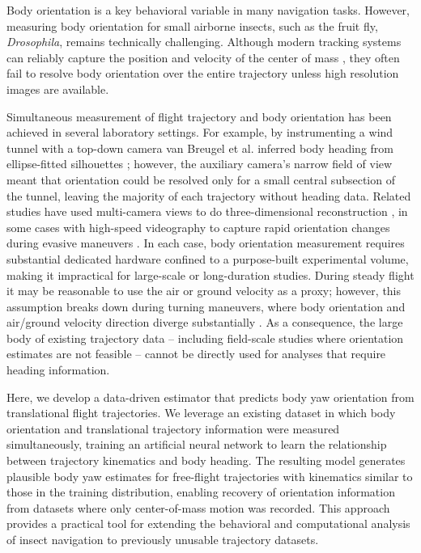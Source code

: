 \documentclass[11pt]{article}
\begin{document}
Body orientation is a key behavioral variable in many navigation tasks. However, measuring body orientation for small airborne insects, such as the fruit fly, \textit{Drosophila}, remains technically challenging. Although modern tracking systems can reliably capture the position and velocity of the center of mass \citep{straw2011multi, vo2024high, deMargerie2015}, they often fail to resolve body orientation over the entire trajectory unless high resolution images are available.

Simultaneous measurement of flight trajectory and body orientation has been achieved in several laboratory settings. For example, by instrumenting a wind tunnel with a top-down camera van Breugel et al. inferred body heading from ellipse-fitted silhouettes \citep{van2014plume}; however, the auxiliary camera's narrow field of view meant that orientation could be resolved only for a small central subsection of the tunnel, leaving the majority of each trajectory without heading data. 
Related studies have used multi-camera views to do three-dimensional reconstruction \citep{cheng2015novel, cheng2015estimating}, in some cases with high-speed videography to capture rapid orientation changes during evasive maneuvers \citep{muijres2014flies}. In each case, body orientation measurement requires substantial dedicated hardware confined to a purpose-built experimental volume, making it impractical for large-scale or long-duration studies. During steady flight it may be reasonable to use the air or ground velocity as a proxy; however, this assumption breaks down during turning maneuvers, where body orientation and air/ground velocity direction diverge substantially \citep{cheng2015estimating, muijres2014flies, van2014plume}. As a consequence, the large body of existing trajectory data -- including field-scale studies where orientation estimates are not feasible \citep{stentiford2025precise} -- cannot be directly used for analyses that require heading information.

Here, we develop a data-driven estimator that predicts body yaw orientation from translational flight trajectories. We leverage an existing dataset \citep{van2014plume} in which body orientation and translational trajectory information were measured simultaneously, training an artificial neural network to learn the relationship between trajectory kinematics and body heading. The resulting model generates plausible body yaw estimates for free-flight trajectories with kinematics similar to those in the training distribution, enabling recovery of orientation information from datasets where only center-of-mass motion was recorded. This approach provides a practical tool for extending the behavioral and computational analysis of insect navigation to previously unusable trajectory datasets.
\end{document}
